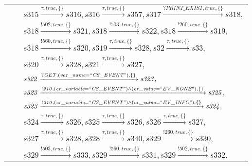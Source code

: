 \begin{tabular}{lcp{350px}}
\end{tabular}

\begin{tabular}{lcp{350px}}
\end{tabular}

\begin{tabular}{lcp{350px}}
& & $\mathit{s315}\xrightarrow{\mathit{\tau}, \mathit{true}, \{\}}\mathit{s316},\mathit{s316}\xrightarrow{\mathit{\tau}, \mathit{true}, \{\}}\mathit{s357},\mathit{s317}\xrightarrow{\mathit{?PRINT\_EXIST}, \mathit{true}, \{\}}\mathit{s318},$ \\
& & $\mathit{s318}\xrightarrow{\mathit{!502}, \mathit{true}, \{\}}\mathit{s321},\mathit{s318}\xrightarrow{\mathit{!503}, \mathit{true}, \{\}}\mathit{s322},\mathit{s318}\xrightarrow{\mathit{!260}, \mathit{true}, \{\}}\mathit{s319},$ \\
& & $\mathit{s318}\xrightarrow{\mathit{!560}, \mathit{true}, \{\}}\mathit{s320},\mathit{s319}\xrightarrow{\mathit{\tau}, \mathit{true}, \{\}}\mathit{s328},\mathit{s32}\xrightarrow{\mathit{\tau}, \mathit{true}, \{\}}\mathit{s33},$ \\
& & $\mathit{s320}\xrightarrow{\mathit{\tau}, \mathit{true}, \{\}}\mathit{s328},\mathit{s321}\xrightarrow{\mathit{\tau}, \mathit{true}, \{\}}\mathit{s327},$ \\
& & $\mathit{s322}\xrightarrow{\mathit{?GET}, \mathit{(var\_name = ``CS\_EVENT")}, \{\}}\mathit{s323},$ \\
& & $\mathit{s323}\xrightarrow{\mathit{!210}, \mathit{(cr\_variable = ``CS\_EVENT") \land (cr\_value = ``EV\_NONE")}, \{\}}\mathit{s325},$ \\
& & $\mathit{s323}\xrightarrow{\mathit{!210}, \mathit{(cr\_variable = ``CS\_EVENT") \land (cr\_value = ``EV\_INFO")}, \{\}}\mathit{s324},$ \\
& & $\mathit{s324}\xrightarrow{\mathit{\tau}, \mathit{true}, \{\}}\mathit{s326},\mathit{s325}\xrightarrow{\mathit{\tau}, \mathit{true}, \{\}}\mathit{s326},\mathit{s326}\xrightarrow{\mathit{\tau}, \mathit{true}, \{\}}\mathit{s327},$ \\
& & $\mathit{s327}\xrightarrow{\mathit{\tau}, \mathit{true}, \{\}}\mathit{s328},\mathit{s328}\xrightarrow{\mathit{\tau}, \mathit{true}, \{\}}\mathit{s340},\mathit{s329}\xrightarrow{\mathit{!260}, \mathit{true}, \{\}}\mathit{s330},$ \\
& & $\mathit{s329}\xrightarrow{\mathit{!503}, \mathit{true}, \{\}}\mathit{s333},\mathit{s329}\xrightarrow{\mathit{!560}, \mathit{true}, \{\}}\mathit{s331},\mathit{s329}\xrightarrow{\mathit{!502}, \mathit{true}, \{\}}\mathit{s332},$ \\

\end{tabular}
